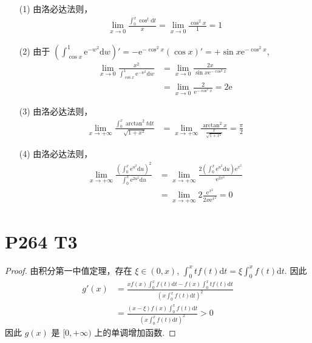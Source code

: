 \documentclass{article}
\newcommand{\dd}{\mathrm{d}}
\newcommand{\dt}{\dd t}
\newcommand{\ee}{\mathrm{e}}
\begin{document}
\begin{itemize}
    \item [(1)] 由洛必达法则，
    \begin{align}
        \lim_{x \to 0}\frac{\int_{0}^{x}\cos^t \dt}{x} = \lim_{x \to 0}\frac{\cos^2 x }{1} = 1
    \end{align}
    \item [(2)] 由于 $\left(\int_{\cos x}^{1}\ee^{-w^2} \dd w\right)' = - \ee^{-\cos^2 x}\left(\cos x\right)' = + \sin x \ee^{-\cos^2 x}$, 
    \begin{align*}
        \lim_{x \to 0}\frac{x^2}{\int_{\cos x}^{1}\ee^{-w^2} \dd w} &= \lim_{x \to 0}\frac{2x}{\sin x \ee^{-\cos^2 x}} \\
        &= \lim_{x \to 0}\frac{2}{\ee^{-\cos^2 x}} = 2 \ee
    \end{align*}
    \item [(3)] 由洛必达法则，
    \begin{align*}
        \lim_{x \to +\infty}\frac{\int_{0}^{x}\arctan^2 t \dt}{\sqrt{1 + x^2}} &= \lim_{x \to +\infty}\frac{\arctan^2 x}{\frac{x}{\sqrt{1 + x^2}}} = \frac{\pi}{2}
    \end{align*}
    \item [(4)] 由洛必达法则，
    \begin{align*}
        \lim_{x \to +\infty}\frac{\left(\int_{0}^{x}\ee^{u^2}\dd u\right)^2}{\int_{0}^{x}\ee^{2u^2}\dd u} &= \lim_{x \to +\infty}\frac{2\left(\int_{0}^{x}\ee^{u^2}\dd u\right)\ee^{x^2}}{\ee^{2x^2}} \\
        &= \lim_{x \to +\infty}2\frac{\ee^{x^2}}{2x\ee^{x^2}} = 0
    \end{align*}
\end{itemize}

\section*{P264 T3}

\begin{proof}
    由积分第一中值定理，存在 $\xi \in (0, x)$, $\int_{0}^{x}t f(t) \dt = \xi \int_{0}^{x}f(t) \dt$. 因此
    \begin{align*}
        g'(x) &= \frac{xf(x)\int_{0}^{x}f(t)\dt - f(x)\int_{0}^{x}tf(t)\dt}{\left(x\int_{0}^{x}f(t)\dt\right)^2} \\
        &= \frac{(x - \xi)f(x)\int_{0}^{x}f(t)\dt}{\left(x\int_{0}^{x}f(t)\dt\right)^2} > 0
    \end{align*} 因此 $g(x)$ 是 $[0, +\infty)$ 上的单调增加函数.
\end{proof}
\end{document}

